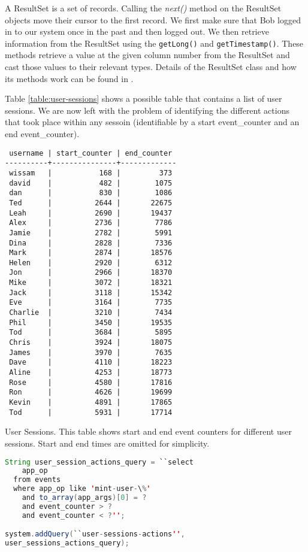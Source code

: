 \noindent
A ResultSet is a set of records. Calling the \emph{next()} method on the ResultSet objects move their cursor to the first record. We first make sure that Bob logged in to our system once in the past and then logged out. We then retrieve information from the ResultSet using the \lstinline$getLong()$ and \lstinline$getTimestamp()$. These methods retrieve a value at the given column number from the ResultSet and cast those values to their relevant types. Details of the ResultSet class and how its methods work can be found in \cite{jdoc}.

Table \ref{table:user-sessions} shows a possible table that contains a list of user sessions. We are now left with the problem of identifying the different actions that took place within any sessoin (identifiable by a start event\_counter and an end event\_counter).

\begin{table}
\begin{verbatim}
 username | start_counter | end_counter 
----------+---------------+-------------
 wissam   |           168 |         373
 david    |           482 |        1075
 dan      |           830 |        1086
 Ted      |          2644 |       22675
 Leah     |          2690 |       19437
 Alex     |          2736 |        7786
 Jamie    |          2782 |        5991
 Dina     |          2828 |        7336
 Mark     |          2874 |       18576
 Helen    |          2920 |        6312
 Jon      |          2966 |       18370
 Mike     |          3072 |       18321
 Jack     |          3118 |       15342
 Eve      |          3164 |        7735
 Charlie  |          3210 |        7434
 Phil     |          3450 |       19535
 Tod      |          3684 |        5895
 Chris    |          3924 |       18075
 James    |          3970 |        7635
 Dave     |          4110 |       18223
 Aline    |          4253 |       18773
 Rose     |          4580 |       17816
 Ron      |          4626 |       19699
 Kevin    |          4891 |       17865
 Tod      |          5931 |       17714
\end{verbatim}
\caption[User Sessions]{User Sessions. This table shows start and end event counters for different user sessions. Start and end times are omitted for simplicity.}
\label{table:user-sessions}
\end{table}

\begin{lstlisting}[language=Java]
String user_session_actions_query = ``select 
    app_op 
  from events 
  where app_op like 'mint-user-\%' 
    and to_array(app_args)[0] = ? 
    and event_counter > ? 
    and event_counter < ?'';

system.addQuery(``user-sessions-actions'', 
user_sessions_actions_query);
\end{lstlisting}

